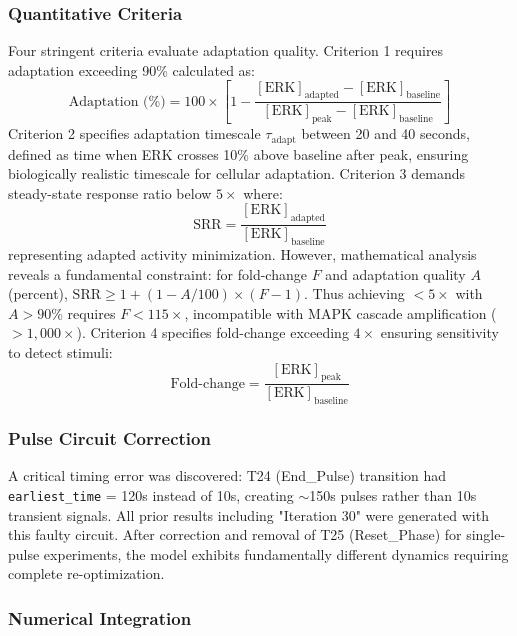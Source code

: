 \documentclass[twocolumn,11pt]{article}
\newcommand{\erk}{ERK}
\newcommand{\srr}{\text{SRR}}
\begin{document}
\subsubsection{Quantitative Criteria}

Four stringent criteria evaluate adaptation quality. Criterion 1 requires adaptation exceeding 90\% calculated as:
\begin{equation}
\text{Adaptation (\%)} = 100 \times \left[1 - \frac{[\text{ERK}]_{\text{adapted}} - [\text{ERK}]_{\text{baseline}}}{[\text{ERK}]_{\text{peak}} - [\text{ERK}]_{\text{baseline}}}\right]
\end{equation}
Criterion 2 specifies adaptation timescale $\tau_{\text{adapt}}$ between 20 and 40 seconds, defined as time when \erk{} crosses 10\% above baseline after peak, ensuring biologically realistic timescale for cellular adaptation. Criterion 3 demands steady-state response ratio \srr{} below $5\times$ where:
\begin{equation}
\text{SRR} = \frac{[\text{ERK}]_{\text{adapted}}}{[\text{ERK}]_{\text{baseline}}}
\end{equation}
representing adapted activity minimization. However, mathematical analysis reveals a fundamental constraint: for fold-change $F$ and adaptation quality $A$ (percent), $\text{SRR} \geq 1 + (1 - A/100) \times (F - 1)$. Thus achieving \srr{} $<5\times$ with $A>90\%$ requires $F<115\times$, incompatible with MAPK cascade amplification ($>1{,}000\times$). Criterion 4 specifies fold-change exceeding $4\times$ ensuring sensitivity to detect stimuli:
\begin{equation}
\text{Fold-change} = \frac{[\text{ERK}]_{\text{peak}}}{[\text{ERK}]_{\text{baseline}}}
\end{equation}

\subsubsection{Pulse Circuit Correction}

A critical timing error was discovered: T24 (End\_Pulse) transition had \texttt{earliest\_time} = 120s instead of 10s, creating $\sim$150s pulses rather than 10s transient signals. All prior results including "Iteration 30" were generated with this faulty circuit. After correction and removal of T25 (Reset\_Phase) for single-pulse experiments, the model exhibits fundamentally different dynamics requiring complete re-optimization.

\subsubsection{Numerical Integration}
\end{document}
